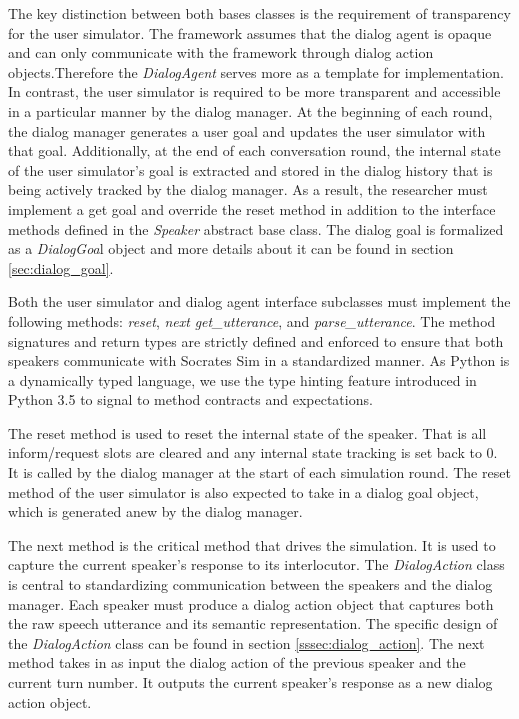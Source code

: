 The key distinction between both bases classes is the requirement of transparency for the user simulator. The framework assumes that the dialog agent is opaque and can only communicate with the framework through dialog action objects.Therefore the \textit{DialogAgent} serves more as a template for implementation.  In contrast, the user simulator is required to be more transparent and accessible in a particular manner by the dialog manager. At the beginning of each round, the dialog manager generates a user goal and updates the user simulator with that goal. Additionally, at the end of each conversation round, the internal state of the user simulator's goal is extracted and stored in the dialog history that is being actively tracked by the dialog manager. As a result, the researcher must implement a get goal and override the reset method in addition to the interface methods defined in the \textit{Speaker} abstract base class. The dialog goal is formalized as a \textit{DialogGoa}l object and more details about it can be found in section \ref{sec:dialog_goal}. 

Both the user simulator and dialog agent interface subclasses must implement the following methods: \textit{reset}, \textit{next} \textit{get\_utterance}, and \textit{parse\_utterance}. The method signatures and return types are strictly defined and enforced to ensure that both speakers communicate with Socrates Sim in a standardized manner. As Python is a dynamically typed language, we use the type hinting feature introduced in Python 3.5 to signal to method contracts and expectations. 

The reset method is used to reset the internal state of the speaker. That is all inform/request slots are cleared and any internal state tracking is set back to 0. It is called by the dialog manager at the start of each simulation round. The reset method of the user simulator is also expected to take in a dialog goal object, which is generated anew by the dialog manager. 

The next method is the critical method that drives the simulation. It is used to capture the current speaker's response to its interlocutor. The \textit{DialogAction} class is central to standardizing communication between the speakers and the dialog manager. Each speaker must produce a dialog action object that captures both the raw speech utterance and its semantic representation. The specific design of the \textit{DialogAction} class can be found in section \ref{sssec:dialog_action}. The next method takes in as input the dialog action of the previous speaker and the current turn number. It outputs the current speaker's response as a new dialog action object.

